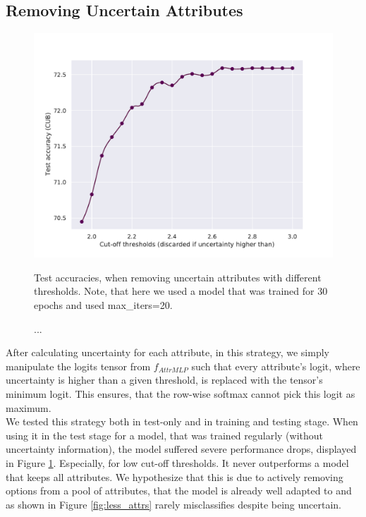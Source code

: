 \documentclass[a4paper,cleardoubleempty,BCOR1cm, 11pt]{report}
\begin{document}
\subsection{Removing Uncertain Attributes}
\begin{figure}[t!]
	\centering
	\begin{minipage}{0.45\textwidth}
		\centering
		\includegraphics[width=1\textwidth]{images/threshold_accuracy.pdf} 
		\caption{Test accuracies, when removing uncertain attributes with different thresholds. Note, that here we used a model that was trained for 30 epochs and used max\_iters=20.\\\hspace{40pt}}
		\label{fig:threshold_accuracies}
	\end{minipage}\hfill
	\begin{minipage}{0.45\textwidth}
		\centering
		\caption{...}
	\end{minipage}
\end{figure}
After calculating uncertainty for each attribute, in this strategy, we simply manipulate the logits tensor from $f_{AttrMLP}$ such that every attribute's logit, where uncertainty is higher than a given threshold, is replaced with the tensor's minimum logit. This ensures, that the row-wise softmax cannot pick this logit as maximum.\\
We tested this strategy both in test-only and in training and testing stage. When using it in the test stage for a model, that was trained regularly (without uncertainty information), the model suffered severe performance drops, displayed in Figure \ref{fig:threshold_accuracies}. Especially, for low cut-off thresholds. It never outperforms a model that keeps all attributes. We hypothesize that this is due to actively removing options from a pool of attributes, that the model is already well adapted to and as shown in Figure \ref{fig:less_attrs} rarely misclassifies despite being uncertain.
\end{document}
